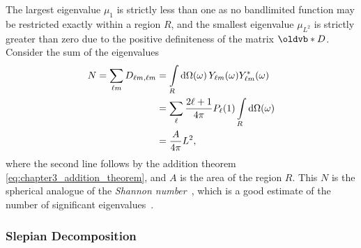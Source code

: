 %
The largest eigenvalue \(\mu_{1}\) is strictly less than one as no bandlimited function may be restricted exactly within a region \(R\), and the smallest eigenvalue \(\mu_{L^{2}}\) is strictly greater than zero due to the positive definiteness of the matrix \(\vb{D}\).
Consider the sum of the eigenvalues
%
\begin{align}\label{eq:chapter3_shannon}
	N
	= \sum\limits_{\ell m} D_{\ell m,\ell m}
	 & = \int\limits_{R} \dd{\Omega(\omega)} {Y}_{\ell m}(\omega) {Y}_{\ell m}^{\ast}(\omega) \nonumber \\
	 & = \sum\limits_{\ell} \frac{2\ell+1}{4\pi} P_{\ell}(1) \int\limits_{R} \dd{\Omega(\omega)} \nonumber           \\
	 & = \frac{A}{4\pi} L^{2},
\end{align}
%
where the second line follows by the addition theorem \cref{eq:chapter3_addition_theorem}, and \(A\) is the area of the region \(R\).
This \(N\) is the spherical analogue of the \emph{Shannon number}~\cite{Simons2006}, which is a good estimate of the number of significant eigenvalues~\cite{Percival1993}.

\subsubsection{Slepian Decomposition}

